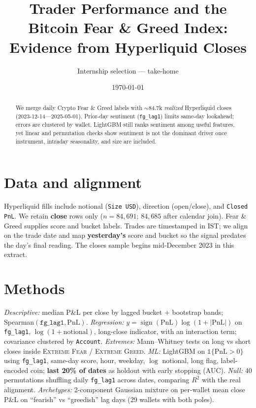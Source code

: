 \documentclass[11pt]{article}
\title{Trader Performance and the Bitcoin Fear \& Greed Index:\\ Evidence from Hyperliquid Closes}
\author{Internship selection --- take-home}
\date{\today}
\begin{document}
\maketitle
\vspace{-0.75em}

\begin{abstract}
\noindent
We merge daily Crypto Fear \& Greed labels with $\sim$84.7k \emph{realized} Hyperliquid closes (2023-12-14---2025-05-01). Prior-day sentiment (\texttt{fg\_lag1}) limits same-day lookahead; errors are clustered by wallet. LightGBM still ranks sentiment among useful features, yet linear and permutation checks show sentiment is not the dominant driver once instrument, intraday seasonality, and size are included.
\end{abstract}
\vspace{-0.35em}

\section*{Data and alignment}
Hyperliquid fills include notional (\texttt{Size USD}), direction (open/close), and \texttt{Closed PnL}. We retain \textbf{close} rows only ($n{=}84{,}691$; $84{,}685$ after calendar join). Fear \& Greed supplies score and bucket labels. Trades are timestamped in IST; we align on the trade date and map \textbf{yesterday's} score and bucket so the signal predates the day's final reading. The closes sample begins mid-December 2023 in this extract.

\section*{Methods}
\textit{Descriptive:} median P\&L per close by lagged bucket + bootstrap bands; Spearman$(\texttt{fg\_lag1},\text{PnL})$.
\textit{Regression:} $y=\operatorname{sign}(\text{PnL})\log(1{+}|\text{PnL}|)$ on \texttt{fg\_lag1}, $\log(1{+}\text{notional})$, long-close indicator, with an interaction term; covariance clustered by \texttt{Account}.
\textit{Extremes:} Mann--Whitney tests on long vs short closes inside \textsc{Extreme Fear} / \textsc{Extreme Greed}.
\textit{ML:} LightGBM on $\mathbb{1}\{\text{PnL}{>}0\}$ using \texttt{fg\_lag1}, same-day score, hour, weekday, $\log$ notional, long flag, label-encoded coin; \textbf{last 20\% of dates} as holdout with early stopping (AUC).
\textit{Null:} 40 permutations shuffling daily \texttt{fg\_lag1} across dates, comparing $R^{2}$ with the real alignment.
\textit{Archetypes:} 2-component Gaussian mixture on per-wallet mean close P\&L on ``fearish'' vs ``greedish'' lag days (29 wallets with both poles).
\end{document}
